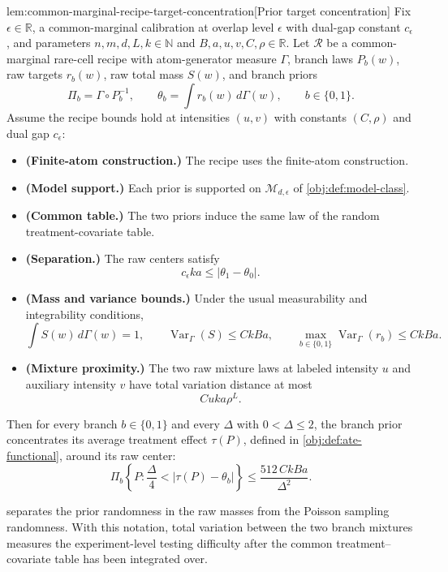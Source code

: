 \begin{lemmav}{lem:common-marginal-recipe-target-concentration}[Prior target concentration]
Fix \(\epsilon\in\mathbb R\), a common-marginal calibration at overlap level \(\epsilon\) with dual-gap constant \(c_\epsilon\), and parameters \(n,m,d,L,k\in\mathbb N\) and \(B,a,u,v,C,\rho\in\mathbb R\).  Let \(\mathcal R\) be a common-marginal rare-cell recipe with atom-generator measure \(\Gamma\), branch laws \(P_b(w)\), raw targets \(r_b(w)\), raw total mass \(S(w)\), and branch priors
\[
\Pi_b=\Gamma\circ P_b^{-1},
\qquad
\theta_b=\int r_b(w)\,d\Gamma(w),
\qquad b\in\{0,1\}.
\]
Assume the recipe bounds hold at intensities \((u,v)\) with constants \((C,\rho)\) and dual gap \(c_\epsilon\):
\begin{itemize}
\item \textbf{(Finite-atom construction.)}  The recipe uses the finite-atom construction.
\item \textbf{(Model support.)}  Each prior is supported on \(\mathcal M_{d,\epsilon}\) of \cref{obj:def:model-class}.
\item \textbf{(Common table.)}  The two priors induce the same law of the random treatment-covariate table.
\item \textbf{(Separation.)}  The raw centers satisfy
\[
c_\epsilon k a\le |\theta_1-\theta_0|.
\]
\item \textbf{(Mass and variance bounds.)}  Under the usual measurability and integrability conditions,
\[
\int S(w)\,d\Gamma(w)=1,\qquad
\operatorname{Var}_\Gamma(S)\le CkBa,\qquad
\max_{b\in\{0,1\}}\operatorname{Var}_\Gamma(r_b)\le CkBa.
\]
\item \textbf{(Mixture proximity.)}  The two raw mixture laws at labeled intensity \(u\) and auxiliary intensity \(v\) have total variation distance at most
\[
Cuka\rho^L.
\]
\end{itemize}
Then for every branch \(b\in\{0,1\}\) and every \(\Delta\) with \(0<\Delta\le2\), the branch prior concentrates its average treatment effect \(\tau(P)\), defined in \cref{obj:def:ate-functional}, around its raw center:
\[
\Pi_b\!\left\{P:\frac{\Delta}{4}<|\tau(P)-\theta_b|\right\}
\le
\frac{512\,CkBa}{\Delta^2}.
\]
\end{lemmav}

 separates the prior randomness in the raw masses from the Poisson sampling randomness. With this notation, total variation between the two branch mixtures measures the experiment-level testing difficulty after the common treatment--covariate table has been integrated over.

